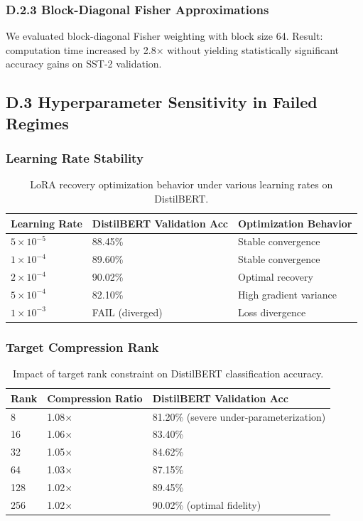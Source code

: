 \subsubsection{D.2.3 Block-Diagonal Fisher Approximations}

We evaluated block-diagonal Fisher weighting with block size 64. Result: 
computation time increased by 2.8$\times$ without yielding statistically significant accuracy gains on SST-2 validation.

\subsection{D.3 Hyperparameter Sensitivity in Failed Regimes}

\subsubsection{Learning Rate Stability}

\begin{table}[H]
\centering
\small
\begin{tabular}{lll}
\toprule
\textbf{Learning Rate} & \textbf{DistilBERT Validation Acc} & \textbf{Optimization Behavior} \\
\midrule
$5\times 10^{-5}$ & 88.45\% & Stable convergence \\
$1\times 10^{-4}$ & 89.60\% & Stable convergence \\
$2\times 10^{-4}$ & 90.02\% & Optimal recovery \\
$5\times 10^{-4}$ & 82.10\% & High gradient variance \\
$1\times 10^{-3}$ & FAIL (diverged) & Loss divergence \\
\bottomrule
\end{tabular}
\caption{LoRA recovery optimization behavior under various learning rates on DistilBERT.}
\label{tab:failed\_lr}
\end{table}

\subsubsection{Target Compression Rank}

\begin{table}[H]
\centering
\small
\begin{tabular}{lll}
\toprule
\textbf{Rank} & \textbf{Compression Ratio} & \textbf{DistilBERT Validation Acc} \\
\midrule
8   & 1.08$\times$ & 81.20\% (severe under-parameterization) \\
16  & 1.06$\times$ & 83.40\% \\
32  & 1.05$\times$ & 84.62\% \\
64  & 1.03$\times$ & 87.15\% \\
128 & 1.02$\times$ & 89.45\% \\
256 & 1.02$\times$ & 90.02\% (optimal fidelity) \\
\bottomrule
\end{tabular}
\caption{Impact of target rank constraint on DistilBERT classification accuracy.}
\label{tab:rank\_fidelity}
\end{table}


